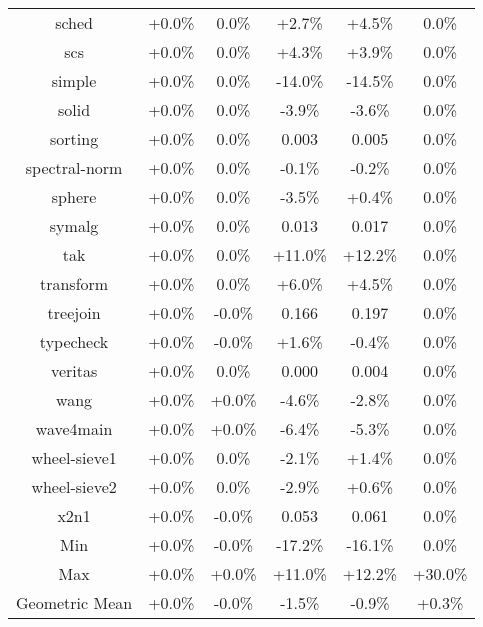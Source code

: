 \begin{tabular}{ c c c c c c }
sched & +0.0\% &  0.0\% & +2.7\% & +4.5\% &  0.0\%\\
scs & +0.0\% &  0.0\% & +4.3\% & +3.9\% &  0.0\%\\
simple & +0.0\% &  0.0\% & -14.0\% & -14.5\% &  0.0\%\\
solid & +0.0\% &  0.0\% & -3.9\% & -3.6\% &  0.0\%\\
sorting & +0.0\% &  0.0\% & 0.003 & 0.005 &  0.0\%\\
spectral-norm & +0.0\% &  0.0\% & -0.1\% & -0.2\% &  0.0\%\\
sphere & +0.0\% &  0.0\% & -3.5\% & +0.4\% &  0.0\%\\
symalg & +0.0\% &  0.0\% & 0.013 & 0.017 &  0.0\%\\
tak & +0.0\% &  0.0\% & +11.0\% & +12.2\% &  0.0\%\\
transform & +0.0\% &  0.0\% & +6.0\% & +4.5\% &  0.0\%\\
treejoin & +0.0\% & -0.0\% & 0.166 & 0.197 &  0.0\%\\
typecheck & +0.0\% & -0.0\% & +1.6\% & -0.4\% &  0.0\%\\
veritas & +0.0\% &  0.0\% & 0.000 & 0.004 &  0.0\%\\
wang & +0.0\% & +0.0\% & -4.6\% & -2.8\% &  0.0\%\\
wave4main & +0.0\% & +0.0\% & -6.4\% & -5.3\% &  0.0\%\\
wheel-sieve1 & +0.0\% &  0.0\% & -2.1\% & +1.4\% &  0.0\%\\
wheel-sieve2 & +0.0\% &  0.0\% & -2.9\% & +0.6\% &  0.0\%\\
x2n1 & +0.0\% & -0.0\% & 0.053 & 0.061 &  0.0\%\\
\hline
Min & +0.0\% & -0.0\% & -17.2\% & -16.1\% &  0.0\%\\
Max & +0.0\% & +0.0\% & +11.0\% & +12.2\% & +30.0\%\\
Geometric Mean & +0.0\% & -0.0\% & -1.5\% & -0.9\% & +0.3\%\\


\end{tabular}
